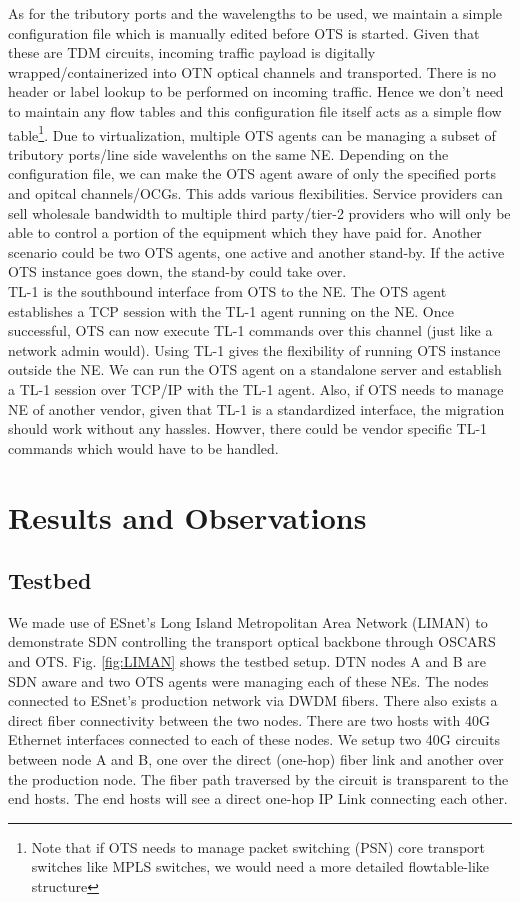 \documentclass{sig-alternate-10pt}
\begin{document}
	As for the tributory ports and the wavelengths to be used, we maintain a simple configuration file which
	is manually edited before OTS is started. Given that these are TDM circuits, incoming traffic payload is
	digitally wrapped/containerized into OTN optical channels and transported. There is no header or label
	lookup to be performed on incoming traffic. Hence we don't need to maintain any flow tables and this
	configuration file itself acts as a simple flow table\footnote{Note that if OTS needs to manage packet
	switching (PSN) core transport switches like MPLS switches, we would need a more detailed flowtable-like
	structure}. Due to virtualization, multiple OTS agents can be managing a subset of tributory ports/line
	side wavelenths on the same NE. Depending on the configuration file, we can make the OTS agent aware of
	only the specified ports and opitcal channels/OCGs. This adds various flexibilities. Service providers
	can sell wholesale bandwidth to multiple third party/tier-2 providers who will only be able to control a
	portion of the equipment which they have paid for. Another scenario could be two OTS agents, one active
	and another stand-by. If the active OTS instance goes down, the stand-by could take over.\\

	TL-1 is the southbound interface from OTS to the NE. The OTS agent establishes a TCP session with
	the TL-1 agent running on the NE. Once successful, OTS can now execute TL-1 commands over this
	channel (just like a network admin would). Using TL-1 gives the flexibility of running OTS instance
	outside the NE. We can run the OTS agent on a standalone server and establish a TL-1 session over
	TCP/IP with the TL-1 agent. Also, if OTS needs to manage NE of another vendor, given that TL-1 is a
	standardized interface, the migration should work without any hassles. Howver, there could be vendor 
	specific TL-1 commands which would have to be handled.

\section{Results and Observations}
\label{sec:results}
	\subsection{Testbed}
	\label{sec:testbed}
	We made use of ESnet's Long Island Metropolitan Area Network (LIMAN) to demonstrate SDN controlling the
	 transport optical backbone through OSCARS and OTS. Fig. \ref{fig:LIMAN} shows the testbed setup. DTN
	nodes A and B are SDN aware and two OTS agents were managing each of these NEs. The nodes connected
	to ESnet's production network via DWDM fibers. There also exists a direct fiber connectivity between the two
	nodes. There are two hosts with 40G Ethernet interfaces connected to each of these nodes. We setup two 40G 
	circuits between node A and B, one over the direct (one-hop) fiber link and another over the production node.
	The fiber path traversed by the circuit is transparent to the end hosts. The end hosts will see a direct one-hop
	IP Link connecting each other.
\end{document}
